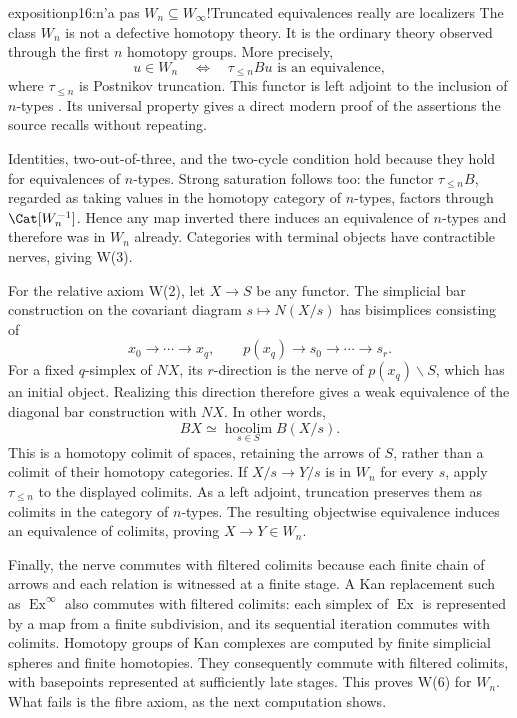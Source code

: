 \begin{dcomment}{exposition}{p16:n'a pas $W_n \subseteq W_\infty$!}{Truncated equivalences really are localizers}
The class \(W_n\) is not a defective homotopy theory. It is the ordinary theory observed through the first \(n\) homotopy groups. More precisely,
\[
  u\in W_n\quad\Longleftrightarrow\quad
  \tau_{\leq n}Bu\text{ is an equivalence},
\]
where \(\tau_{\leq n}\) is Postnikov truncation. This functor is left adjoint to the inclusion of \(n\)-types \citep[Proposition~5.5.6.18]{Lurie2009HTT}. Its universal property gives a direct modern proof of the assertions the source recalls without repeating.

Identities, two-out-of-three, and the two-cycle condition hold because they hold for equivalences of \(n\)-types. Strong saturation follows too: the functor \(\tau_{\leq n}B\), regarded as taking values in the homotopy category of \(n\)-types, factors through \(\Cat[W_n^{-1}]\). Hence any map inverted there induces an equivalence of \(n\)-types and therefore was in \(W_n\) already. Categories with terminal objects have contractible nerves, giving W(3).

For the relative axiom W(2), let \(X\to S\) be any functor. The simplicial bar construction on the covariant diagram \(s\mapsto N(X/s)\) has bisimplices consisting of
\[
 x_0\to\cdots\to x_q,\qquad
 p(x_q)\to s_0\to\cdots\to s_r.
\]
For a fixed \(q\)-simplex of \(NX\), its \(r\)-direction is the nerve of \(p(x_q)\backslash S\), which has an initial object. Realizing this direction therefore gives a weak equivalence of the diagonal bar construction with \(NX\). In other words,
\[
 BX\simeq\operatorname*{hocolim}_{s\in S}B(X/s).
\]
This is a homotopy colimit of spaces, retaining the arrows of \(S\), rather than a colimit of their homotopy categories. If \(X/s\to Y/s\) is in \(W_n\) for every \(s\), apply \(\tau_{\leq n}\) to the displayed colimits. As a left adjoint, truncation preserves them as colimits in the category of \(n\)-types. The resulting objectwise equivalence induces an equivalence of colimits, proving \(X\to Y\in W_n\).

Finally, the nerve commutes with filtered colimits because each finite chain of arrows and each relation is witnessed at a finite stage. A Kan replacement such as \(\operatorname{Ex}^{\infty}\) also commutes with filtered colimits: each simplex of \(\operatorname{Ex}\) is represented by a map from a finite subdivision, and its sequential iteration commutes with colimits. Homotopy groups of Kan complexes are computed by finite simplicial spheres and finite homotopies. They consequently commute with filtered colimits, with basepoints represented at sufficiently late stages. This proves W(6) for \(W_n\). What fails is the fibre axiom, as the next computation shows.
\end{dcomment}

